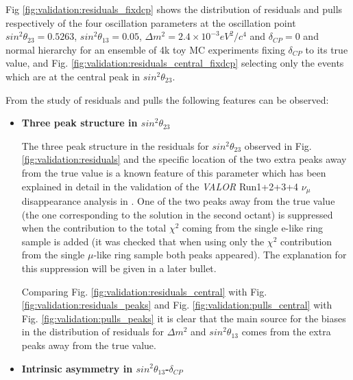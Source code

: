 Fig \ref{fig:validation:residuals_fixdcp} shows the distribution of residuals and pulls respectively of the four oscillation parameters at the oscillation point $sin^{2}\theta_{23} = 0.5263$, $sin^{2}\theta_{13} = 0.05$, $\Delta m^{2} = 2.4 \times 10^{-3} eV^{2}/c^{4}$ and $\delta_{CP} = 0$ and normal hierarchy for an ensemble of 4k toy MC experiments fixing $\delta_{CP} $ to its true value, and Fig. \ref{fig:validation:residuals_central_fixdcp} selecting only the events which are at the central peak in $sin^{2}\theta_{23}$.

From the study of residuals and pulls the following features can be observed:

\begin{itemize}
\item{\textbf{Three peak structure in $sin^{2}\theta_{23}$}

The three peak structure in the residuals for $sin^{2}\theta_{23}$ observed in Fig. \ref{fig:validation:residuals}
and the specific location of the two extra peaks away from the true value 
is a known feature of this parameter which has been explained in detail in the validation of the
\textit{VALOR} Run1+2+3+4 $\nu_{\mu}$ disappearance analysis in \cite{OurRun1234DisappAnalysis3Flavour}.
One of the two peaks away from the true value (the one corresponding to the solution in the second octant) is 
suppressed when the contribution to the total $\chi^{2}$ coming from the single e-like ring sample is added
(it was checked that when using only the $\chi^{2}$ contribution from the single $\mu$-like ring sample 
both peaks appeared). The explanation for this suppression will be given in a later bullet.

Comparing Fig. \ref{fig:validation:residuals_central} with Fig. \ref{fig:validation:residuals_peaks} and
Fig. \ref{fig:validation:pulls_central} with Fig. \ref{fig:validation:pulls_peaks} it is clear that the main
source for the biases in the distribution of residuals for $\Delta m^{2}$ and $sin^{2}\theta_{13}$
comes from the extra peaks away from the true value. 
}


\item{\textbf{Intrinsic asymmetry in $sin^{2}\theta_{13}$-$\delta_{CP}$}

}
\end{itemize}
